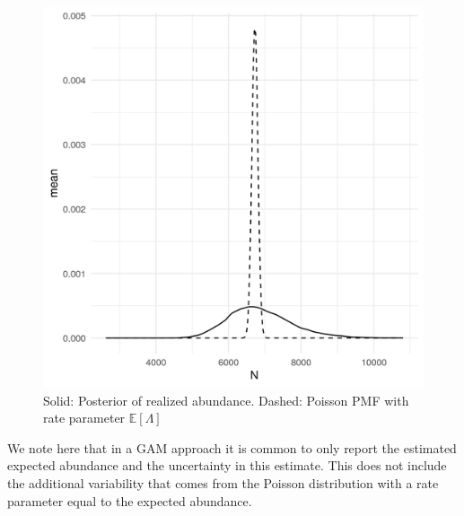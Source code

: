 \documentclass[preprint,12pt]{elsarticle}
\begin{document}
\begin{figure}
	\includegraphics[scale=0.6]{figures/realized_abundance_vs_exp.png}
	\caption{Solid:  Posterior of realized abundance.  Dashed:  Poisson PMF with rate parameter $\mathbb{E}[\Lambda]$}
	\label{fig:realized-abundance-comparison}
\end{figure}
We note here that in a GAM approach it is common to only report the estimated expected abundance and the uncertainty in this estimate.  This does not include the additional variability that comes from the Poisson distribution with a rate parameter equal to the expected abundance.  
\end{document}
